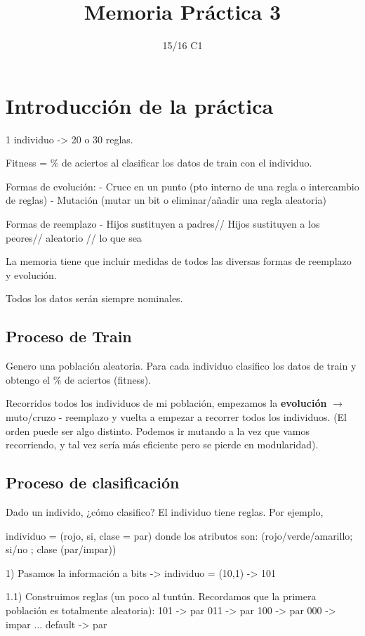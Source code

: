 \documentclass[nochap]{apuntes}
\title{Memoria Práctica 3}
\author{}
\date{15/16 C1}
\begin{document}
\pagestyle{plain}
\maketitle

\tableofcontents
\newpage

\section{Introducción de la práctica}
1 individuo -> 20 o 30 reglas.

Fitness = \% de aciertos al clasificar los datos de train con el individuo.

Formas de evolución:
- Cruce en un punto (pto interno de una regla o intercambio de reglas)
- Mutación (mutar un bit o eliminar/añadir una regla aleatoria)

Formas de reemplazo
- Hijos sustituyen a padres// Hijos sustituyen a los peores// aleatorio // lo que sea


La memoria tiene que incluir medidas de todos las diversas formas de reemplazo y evolución.

Todos los datos serán siempre nominales.

\subsection{Proceso de Train}

Genero una población aleatoria. Para cada individuo clasifico los datos de train y obtengo el \% de aciertos (fitness).

Recorridos todos los individuos de mi población, empezamos la \textbf{evolución} $\to$ muto/cruzo - reemplazo y vuelta a empezar a recorrer todos los individuos. (El orden puede ser algo distinto. Podemos ir mutando a la vez que vamos recorriendo, y tal vez sería más eficiente pero se pierde en modularidad).

\subsection{Proceso de clasificación}

Dado un individo, ¿cómo clasifico? El individuo tiene reglas. Por ejemplo,

individuo  = (rojo, si, clase = par) donde los atributos son: (rojo/verde/amarillo; si/no ; clase (par/impar))

1) Pasamos la información a bits -> individuo = (10,1) -> 101

1.1) Construimos reglas (un poco al tuntún. Recordamos que la primera población es totalmente aleatoria):
	101 -> par
	011 -> par
	100 -> par
	000 -> impar
	...
	default -> par
\end{document}
